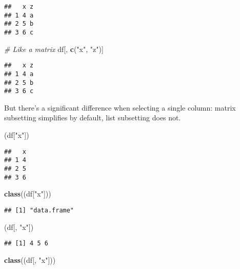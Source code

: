 \documentclass[
]{book}
\newenvironment{Shaded}{\begin{snugshade}}{\end{snugshade}}
\newcommand{\CommentTok}[1]{\textcolor[rgb]{0.56,0.35,0.01}{\textit{#1}}}
\newcommand{\KeywordTok}[1]{\textcolor[rgb]{0.13,0.29,0.53}{\textbf{#1}}}
\newcommand{\NormalTok}[1]{#1}
\newcommand{\StringTok}[1]{\textcolor[rgb]{0.31,0.60,0.02}{#1}}
\begin{document}
\begin{verbatim}
##   x z
## 1 4 a
## 2 5 b
## 3 6 c
\end{verbatim}

\begin{Shaded}
\begin{Highlighting}[]
\CommentTok{\# Like a matrix}
\NormalTok{df[, }\KeywordTok{c}\NormalTok{(}\StringTok{"x"}\NormalTok{, }\StringTok{"z"}\NormalTok{)]}
\end{Highlighting}
\end{Shaded}

\begin{verbatim}
##   x z
## 1 4 a
## 2 5 b
## 3 6 c
\end{verbatim}

But there's a significant difference when selecting a single column: matrix subsetting simplifies by default, list subsetting does not.

\begin{Shaded}
\begin{Highlighting}[]
\NormalTok{(df[}\StringTok{"x"}\NormalTok{])}
\end{Highlighting}
\end{Shaded}

\begin{verbatim}
##   x
## 1 4
## 2 5
## 3 6
\end{verbatim}

\begin{Shaded}
\begin{Highlighting}[]
\KeywordTok{class}\NormalTok{((df[}\StringTok{"x"}\NormalTok{]))}
\end{Highlighting}
\end{Shaded}

\begin{verbatim}
## [1] "data.frame"
\end{verbatim}

\begin{Shaded}
\begin{Highlighting}[]
\NormalTok{(df[, }\StringTok{"x"}\NormalTok{])}
\end{Highlighting}
\end{Shaded}

\begin{verbatim}
## [1] 4 5 6
\end{verbatim}

\begin{Shaded}
\begin{Highlighting}[]
\KeywordTok{class}\NormalTok{((df[, }\StringTok{"x"}\NormalTok{]))}
\end{Highlighting}
\end{Shaded}
\end{document}
